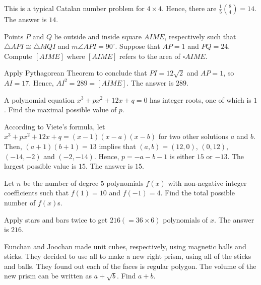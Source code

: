 \begin{solution}
This is a typical Catalan number problem for $4\times4$. Hence, there are $\frac{1}{5}\binom{8}{4}=14$. The answer is $14$.
\end{solution}

\begin{problem}
Points $P$ and $Q$ lie outside and inside square $AIME$, respectively such that $\triangle API \cong \triangle MQI$ and $m\angle API = 90^\circ$. Suppose that $AP=1$ and $PQ=24$. Compute $[AIME]$ where $[AIME]$ refers to the area of $\square AIME$.
\end{problem}

\begin{solution}
Apply Pythagorean Theorem to conclude that $PI=12\sqrt{2}$ and $AP=1$, so $AI=17$. Hence, $AI^2=289=[AIME]$. The answer is $289$.
\end{solution}

\begin{problem}
A polynomial equation $x^3+px^2+12x+q=0$ has integer roots, one of which is $1$. Find the maximal possible value of $p$.
\end{problem}

\begin{solution}
According to Viete's formula, let $x^3+px^2+12x+q=(x-1)(x-a)(x-b)$ for two other solutions $a$ and $b$. Then, $(a+1)(b+1)=13$ implies that $(a,b)=(12,0)$, $(0,12)$, $(-14,-2)$ and $(-2,-14)$. Hence, $p=-a-b-1$ is either $15$ or $-13$. The largest possible value is $15$. The answer is $15$.
\end{solution}

\begin{problem}
Let $n$ be the number of degree $5$ polynomials $f(x)$ with non-negative integer coefficients such that $f(1)=10$ and $f(-1)=4$. Find the total possible number of $f(x)$s.
\end{problem}

\begin{solution}
Apply stars and bars twice to get $216(=36\times6)$ polynomials of $x$. The answer is $216$.
\end{solution}

\begin{problem}
Eunchan and Joochan made unit cubes, respectively, using magnetic balls and sticks. They decided to use all to make a new right prism, using all of the sticks and balls. They found out each of the faces is regular polygon. The volume of the new prism can be written as $a+\sqrt{b}$. Find $a+b$.
\end{problem}

